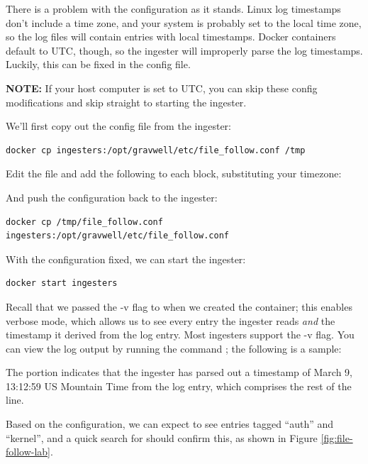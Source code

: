 There is a problem with the configuration as it stands. Linux log
timestamps don't include a time zone, and your system is probably set to
the local time zone, so the log files will contain entries with local
timestamps. Docker containers default to UTC, though, so the ingester
will improperly parse the log timestamps. Luckily, this can be fixed in
the config file. 

\textbf{NOTE:} If your host computer is set to UTC, you can skip these config modifications and skip straight to starting the ingester.

We'll first copy out the config file from the ingester:

\begin{Verbatim}[breaklines=true]
docker cp ingesters:/opt/gravwell/etc/file_follow.conf /tmp
\end{Verbatim}

Edit the file and add the following to each
block, substituting your timezone:


And push the configuration back to the ingester:

\begin{Verbatim}[breaklines=true]
docker cp /tmp/file_follow.conf ingesters:/opt/gravwell/etc/file_follow.conf 
\end{Verbatim}

With the configuration fixed, we can start the ingester:

\begin{Verbatim}[breaklines=true]
docker start ingesters
\end{Verbatim}

Recall that we passed the -v flag to 
when we created the container; this enables verbose mode, which allows us to see every entry
the ingester reads \emph{and} the timestamp it derived from the log entry.
Most ingesters support the -v flag. You can view the log output by running
the command ; the following is a sample:


The portion  indicates that the
ingester has parsed out a timestamp of March 9, 13:12:59 US Mountain
Time from the log entry, which comprises the rest of the line.

Based on the configuration, we can expect to see entries tagged
``auth'' and ``kernel'', and a quick search for  should
confirm this, as shown in Figure \ref{fig:file-follow-lab}.

